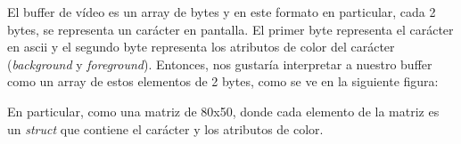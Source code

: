 \documentclass[]{scrartcl}
\begin{document}
\begin{center}
  \noindent {}
  \label{fig:videobuffer01}
\end{center}

El buffer de vídeo es un array de bytes y en este formato en particular, cada 2 bytes, se representa un carácter en pantalla. El primer byte representa el carácter en ascii y el segundo byte representa los atributos de color del carácter (\textit{background} y \textit{foreground}). Entonces, nos gustaría interpretar a nuestro buffer como un array de estos elementos de 2 bytes, como se ve en la siguiente figura:

\begin{center}
  \noindent {}
  \label{fig:videobuffer02}
\end{center}

En particular, como una matriz de 80x50, donde cada elemento de la matriz es un \textit{struct} que contiene el carácter y los atributos de color. 

\begin{center}
  \noindent {}
  \label{fig:videobuffer03}
\end{center}
\end{document}
